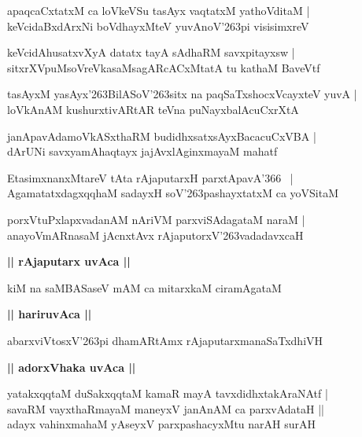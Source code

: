 \documentclass[twoside,12pt,openright]{book}
\def\S{\char'263}
\newcounter{shloka}[chapter]
\def\uvaca#1{\centerline{{\large\textbf{#1}}}}
\begin{document}
\begin{shloka}%
apaqcaCxtatxM ca loVkeVSu tasAyx vaqtatxM yathoVditaM |\\
keVcidaBxdArxNi boVdhayxMteV yuvAnoV\S pi visisimxreV 
\end{shloka}

\begin{shloka}%
keVcidAhusatxvXyA datatx tayA sAdhaRM savxpitayxsw |\\
sitxrXVpuMsoVreVkasaMsagARcACxMtatA tu kathaM BaveVtf
\end{shloka}

\begin{shloka}%
tasAyxM yasAyx\S BilASoV\S sitx na paqSaTxshocxVcayxteV yuvA |\\
loVkAnAM kushurxtivARtAR teVna puNayxbalAcuCxrXtA
\end{shloka}

\begin{shloka}%
janApavAdamoVkASxthaRM budidhxsatxsAyxBacacuCxVBA |\\
dArUNi savxyamAhaqtayx jajAvxlAginxmayaM mahatf
\end{shloka}

\begin{shloka}%
EtasimxnanxMtareV tAta rAjaputarxH parxtApavA\char'366 ~|\\
AgamatatxdagxqqhaM sadayxH soV\S pashayxtatxM ca yoVSitaM 
\end{shloka}

\begin{shloka}%
porxVtuPxlapxvadanAM nAriVM parxviSAdagataM naraM |\\
anayoVmARnasaM jAcnxtAvx rAjaputorxV\S vadadavxcaH
\end{shloka}

\uvaca{|| rAjaputarx uvAca ||}

\begin{shloka}%
kiM na saMBASaseV mAM ca mitarxkaM ciramAgataM 
\end{shloka}

\uvaca{|| hariruvAca ||}

\begin{shloka}%
abarxviVtosxV\S pi dhamARtAmx rAjaputarxmanaSaTxdhiVH 
\end{shloka}

\uvaca{|| adorxVhaka uvAca ||}

\begin{shloka}%
yatakxqqtaM duSakxqqtaM kamaR mayA tavxdidhxtakAraNAtf |\\
savaRM vayxthaRmayaM maneyxV janAnAM ca parxvAdataH ||\\
adayx vahinxmahaM yAseyxV parxpashacyxMtu narAH surAH 
\end{shloka}
\end{document}
